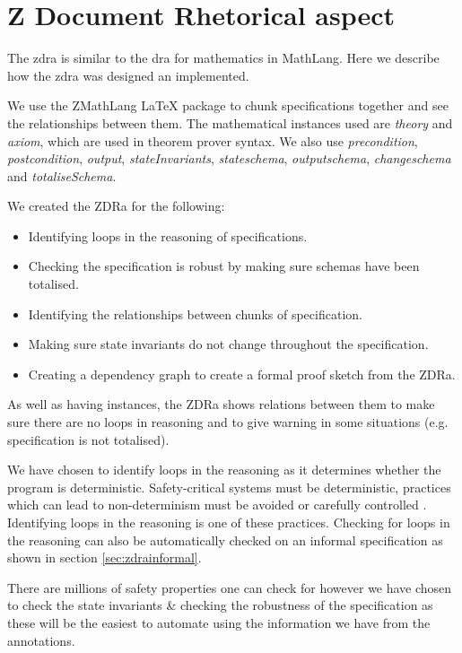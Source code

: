 \chapter{Z Document Rhetorical aspect}
\label{ch:zdra}
The \gls{zdra} is similar to the \gls{dra} for mathematics in MathLang. Here we describe how
the \gls{zdra} was designed an implemented. 

We use the ZMathLang \LaTeX{} package to chunk specifications together and see
the relationships between them. The mathematical instances used are
\textit{theory} and \textit{axiom}, which are used in theorem prover syntax. We
also use \textit{precondition}, \textit{postcondition}, \textit{output},
\textit{stateInvariants}, \textit{stateschema}, \textit{outputschema},
\textit{changeschema} and \textit{totaliseSchema}.

We created the ZDRa for the following:

\begin{itemize}

\item Identifying loops in the reasoning of specifications.
\item Checking the specification is robust by making sure schemas have been
totalised.
\item Identifying the relationships between chunks of specification.
\item Making sure state invariants do not change throughout the specification.
\item Creating a dependency graph to create a formal proof sketch from the ZDRa.
\end{itemize}

As well as having instances, the ZDRa shows relations between them to make sure
there are no loops in reasoning and to give warning in some situations (e.g.
specification is not totalised).

We have chosen to identify loops in the reasoning as it determines whether the
program is deterministic. Safety-critical systems must be deterministic,
practices which can lead to non-determinism must be avoided or carefully
controlled \cite{rierson2013developing}. Identifying loops in the reasoning is
one of these practices. Checking for loops in the reasoning can also be
automatically checked on an informal specification as shown in section \ref{sec:zdrainformal}.

There are millions of safety properties one can check for however we have chosen
to check the state invariants \& checking the robustness of the specification as
these will be the easiest to automate using the information we have from the
annotations.

